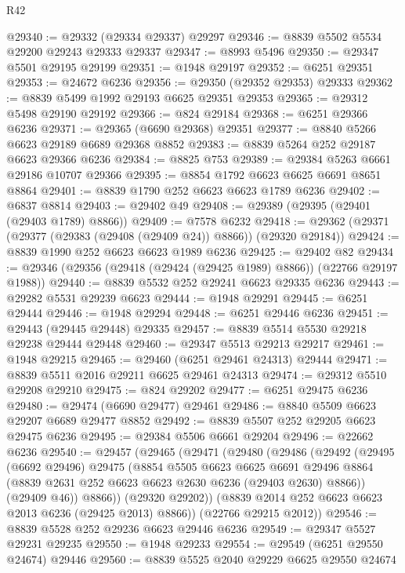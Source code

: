 \begin{lexlean}{R42}
\begin{coremodule}
{@29340 := @29332 (@29334 @29337) @29297
@29346 := @8839 @5502 @5534 @29200 @29243 @29333 @29337
@29347 := @8993 @5496
@29350 := @29347 @5501 @29195 @29199
@29351 := @1948 @29197
@29352 := @6251 @29351
@29353 := @24672 @6236
@29356 := @29350 (@29352 @29353) @29333
@29362 := @8839 @5499 @1992 @29193 @6625 @29351 @29353
@29365 := @29312 @5498 @29190 @29192
@29366 := @824 @29184
@29368 := @6251 @29366 @6236
@29371 := @29365 (@6690 @29368) @29351
@29377 := @8840 @5266 @6623 @29189 @6689 @29368 @8852
@29383 := @8839 @5264 @252 @29187 @6623 @29366 @6236
@29384 := @8825 @753
@29389 := @29384 @5263 @6661 @29186 @10707 @29366
@29395 := @8854 @1792 @6623 @6625 @6691 @8651 @8864
@29401 := @8839 @1790 @252 @6623 @6623 @1789 @6236
@29402 := @6837 @8814
@29403 := @29402 @49
@29408 := @29389 (@29395 (@29401 (@29403 @1789) @8866))
@29409 := @7578 @6232
@29418 := @29362 (@29371 (@29377 (@29383 (@29408 (@29409 @24)) @8866)) (@29320 @29184))
@29424 := @8839 @1990 @252 @6623 @6623 @1989 @6236
@29425 := @29402 @82
@29434 := @29346 (@29356 (@29418 (@29424 (@29425 @1989) @8866)) (@22766 @29197 @1988))
@29440 := @8839 @5532 @252 @29241 @6623 @29335 @6236
@29443 := @29282 @5531 @29239 @6623
@29444 := @1948 @29291
@29445 := @6251 @29444
@29446 := @1948 @29294
@29448 := @6251 @29446 @6236
@29451 := @29443 (@29445 @29448) @29335
@29457 := @8839 @5514 @5530 @29218 @29238 @29444 @29448
@29460 := @29347 @5513 @29213 @29217
@29461 := @1948 @29215
@29465 := @29460 (@6251 @29461 @24313) @29444
@29471 := @8839 @5511 @2016 @29211 @6625 @29461 @24313
@29474 := @29312 @5510 @29208 @29210
@29475 := @824 @29202
@29477 := @6251 @29475 @6236
@29480 := @29474 (@6690 @29477) @29461
@29486 := @8840 @5509 @6623 @29207 @6689 @29477 @8852
@29492 := @8839 @5507 @252 @29205 @6623 @29475 @6236
@29495 := @29384 @5506 @6661 @29204
@29496 := @22662 @6236
@29540 := @29457
    (@29465
      (@29471
        (@29480
          (@29486
            (@29492
              (@29495
                (@6692 @29496)
                @29475
                (@8854
                  @5505
                  @6623
                  @6625
                  @6691
                  @29496
                  @8864
                  (@8839 @2631 @252 @6623 @6623 @2630 @6236 (@29403 @2630) @8866))
                (@29409 @46))
              @8866))
          (@29320 @29202))
        (@8839 @2014 @252 @6623 @6623 @2013 @6236 (@29425 @2013) @8866))
      (@22766 @29215 @2012))
@29546 := @8839 @5528 @252 @29236 @6623 @29446 @6236
@29549 := @29347 @5527 @29231 @29235
@29550 := @1948 @29233
@29554 := @29549 (@6251 @29550 @24674) @29446
@29560 := @8839 @5525 @2040 @29229 @6625 @29550 @24674
}
\end{coremodule}
\end{lexlean}
